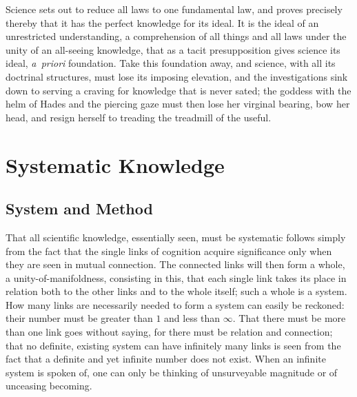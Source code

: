 \documentclass[12pt]{book}
\begin{document}
Science sets out to reduce all laws to one fundamental law, and proves
precisely thereby that it has the perfect knowledge for its ideal. It is the
ideal of an unrestricted understanding, a comprehension of all things and all
laws under the unity of an all-seeing knowledge, that as a tacit presupposition
gives science its ideal, \textit{a~priori} foundation. Take this foundation
away, and science, with all its doctrinal structures, must lose its imposing
elevation, and the investigations sink down to serving a craving for knowledge
that is never sated; the goddess with the helm of Hades and the piercing gaze
must then lose her virginal bearing, bow her head, and resign herself to
treading the treadmill of the useful.

\chapter{Systematic Knowledge}

\section{System and Method}
\label{sec:8}

\noindent That all scientific knowledge, essentially seen, must be systematic
follows simply from the fact that the single links of cognition acquire
significance only when they are seen in mutual connection. The connected links
will then form a whole, a unity-of-manifoldness, consisting in this, that each
single link takes its place in relation both to the other links and to the
whole itself; such a whole is a system. How many links are necessarily needed
to form a system can easily be reckoned: their number must be greater than $1$
and less than $\infty$. That there must be more than one link goes without
saying, for there must be relation and connection; that no definite, existing
system can have infinitely many links is seen from the fact that a definite and
yet infinite number does not exist. When an infinite system is spoken of, one
can only be thinking of unsurveyable magnitude or of unceasing becoming.
\end{document}
